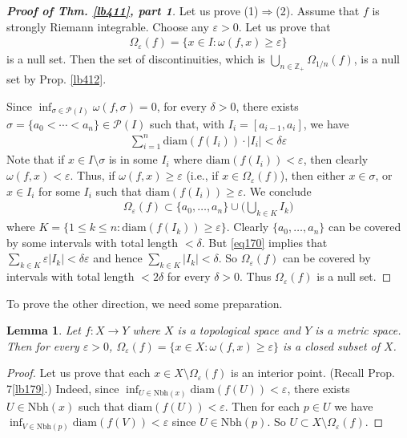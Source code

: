 \documentclass[12pt,b5paper,notitlepage]{article}
\theoremstyle{definition}
\theoremstyle{plain}
\newtheorem{lm}[df]{Lemma}
\newcommand{\mc}{\mathcal}
\newcommand{\Zbb}{\mathbb Z}
\newcommand{\Nbh}{\mathrm{Nbh}}
\newcommand{\diam}{\mathrm{diam}}
\newcommand{\eps}{\varepsilon}
\numberwithin{equation}{section}
\begin{document}
\begin{proof}[\textbf{Proof of Thm. \ref{lb411}, part 1}]
Let us prove (1)$\Rightarrow$(2). Assume that $f$ is strongly Riemann integrable. Choose any $\eps>0$. Let us prove that
\begin{align}
\Omega_\eps(f)=\{x\in I:\omega(f,x)\geq\eps\}
\end{align}
is a null set. Then the set of discontinuities, which is $\bigcup_{n\in\Zbb_+}\Omega_{1/n}(f)$, is a null set by Prop. \ref{lb412}.

Since $\inf_{\sigma\in\mc P(I)}\omega(f,\sigma)=0$, for every $\delta>0$, there exists $\sigma=\{a_0<\cdots<a_n\}\in\mc P(I)$ such that, with $I_i=[a_{i-1},a_i]$, we have 
\begin{align}
\sum_{i=1}^n \diam(f(I_i))\cdot |I_i|<\delta\eps\label{eq170}
\end{align}
Note that if $x\in I\setminus\sigma$ is in some $I_i$ where $\diam(f(I_i))<\eps$, then clearly $\omega(f,x)<\eps$. Thus, if $\omega(f,x)\geq \eps$ (i.e., if $x\in\Omega_\eps(f)$), then either $x\in\sigma$, or $x\in I_i$ for some $I_i$ such that $\diam(f(I_i))\geq\eps$. We conclude
\begin{align*}
\Omega_\eps(f)\subset\{a_0,\dots,a_n\}\cup\Big(\bigcup_{k\in K}I_k\Big)
\end{align*}
where $K=\{1\leq k\leq n:\diam(f(I_k))\geq\eps\}$. Clearly $\{a_0,\dots,a_n\}$ can be covered by some intervals with total length $<\delta$. But \eqref{eq170} implies that $\sum_{k\in K}\eps|I_k|<\delta\eps$ and hence $\sum_{k\in K}|I_k|<\delta$. So $\Omega_\eps(f)$ can be covered by intervals with total length $<2\delta$ for every $\delta>0$. Thus $\Omega_\eps(f)$ is a null set.
\end{proof}


To prove the other direction, we need some preparation.


\begin{lm}\label{lb414}
Let $f:X\rightarrow Y$ where $X$ is a topological space and $Y$ is a metric space. Then for every $\eps>0$, $\Omega_\eps(f)=\{x\in X:\omega(f,x)\geq\eps\}$ is a closed subset of $X$.
\end{lm}

\begin{proof}
Let us prove that each $x\in X\setminus\Omega_\eps(f)$ is an interior point. (Recall Prop. 7\ref{lb179}.) Indeed, since $\inf_{U\in\Nbh(x)}\diam(f(U))<\eps$, there exists $U\in\Nbh(x)$ such that $\diam(f(U))<\eps$. Then for each $p\in U$ we have $\inf_{V\in\Nbh(p)}\diam(f(V))<\eps$ since $U\in\Nbh(p)$. So $U\subset X\setminus\Omega_\eps(f)$.
\end{proof}
\end{document}
